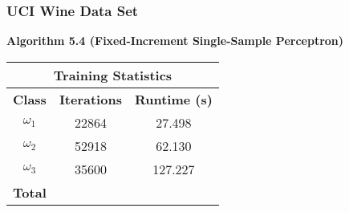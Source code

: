 \documentclass{article}
\newcommand{\result}[1]{\subsubsection*{#1}}
\newcommand{\fakesection}[1]{{\bf #1}\par}
\begin{document}
\result{UCI Wine Data Set}
\fakesection{Algorithm 5.4 (Fixed-Increment Single-Sample Perceptron)}
\begin{center}
\begin{tabular}{|c|c|c|}
\hline\multicolumn{3}{|c|}{{\bf Training Statistics}}\\
\hline{\bf Class} & {\bf Iterations} & {\bf Runtime (s)}\\\hline
$\omega_1$ & 22864 & 27.498 \\
$\omega_2$ & 52918 & 62.130 \\
$\omega_3$ & 35600 & 127.227\\\hline
{\bf Total} & & \\\hline
\end{tabular}
\end{center}
\end{document}
